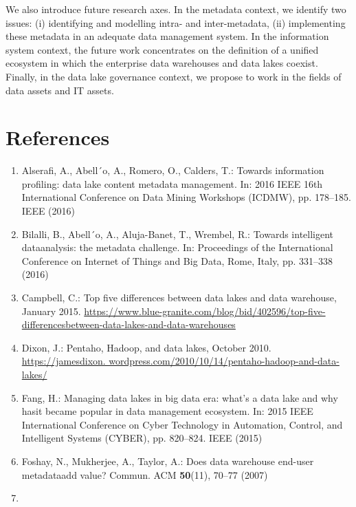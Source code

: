\documentclass[a4paper,12pt,notitlepage,twoside,openright]{article}
\begin{document}
We also introduce future research axes. In the metadata context, we
identify two issues: (i) identifying and modelling intra- and
inter-metadata, (ii) implementing these metadata in an adequate data
management system. In the information system context, the future work
concentrates on the definition of a unified ecosystem in which the
enterprise data warehouses and data lakes coexist. Finally, in the data
lake governance context, we propose to work in the fields of data assets
and IT assets.

\hypertarget{references}{%
\section*{References}\label{references}}

\begin{enumerate}
\def\labelenumi{\arabic{enumi}.}
\item
  Alserafi, A., Abell´o, A., Romero, O., Calders, T.: Towards
  information profiling: data lake content metadata management. In: 2016
  IEEE 16th International Conference on Data Mining Workshops (ICDMW),
  pp. 178--185. IEEE (2016)
\item
  Bilalli, B., Abell´o, A., Aluja-Banet, T., Wrembel, R.: Towards
  intelligent dataanalysis: the metadata challenge. In: Proceedings of
  the International Conference on Internet of Things and Big Data, Rome,
  Italy, pp. 331--338 (2016)
\item
  Campbell, C.: Top five differences between data lakes and data
  warehouse, January 2015.
  \href{https://www.blue-granite.com/blog/bid/402596/top-five-differences-between-data-lakes-and-data-warehouses}{https://www.blue-granite.com/blog/bid/402596/top-five-differencesbetween-data-lakes-and-data-warehouses}
\item
  Dixon, J.: Pentaho, Hadoop, and data lakes, October 2010.
  \href{https://jamesdixon.wordpress.com/2010/10/14/pentaho-hadoop-and-data-lakes/}{https://jamesdixon.
  wordpress.com/2010/10/14/pentaho-hadoop-and-data-lakes/}
\item
  Fang, H.: Managing data lakes in big data era: what's a data lake and
  why hasit became popular in data management ecosystem. In: 2015 IEEE
  International Conference on Cyber Technology in Automation, Control,
  and Intelligent Systems (CYBER), pp. 820--824. IEEE (2015)
\item
  Foshay, N., Mukherjee, A., Taylor, A.: Does data warehouse end-user
  metadataadd value? Commun. ACM \textbf{50}(11), 70--77 (2007)
\item

\end{enumerate}
\end{document}
